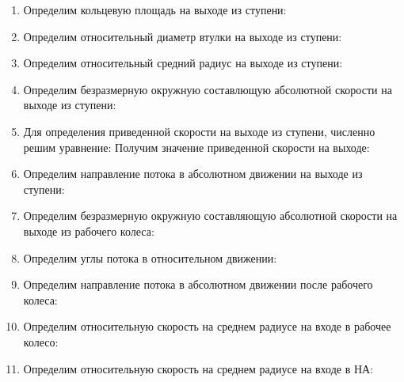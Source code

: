 \begin{enumerate}
	\item Определим кольцевую площадь на выходе из ступени:
	\item Определим относительный диаметр втулки на выходе из ступени:
	\item Определим относительный средний радиус на выходе из ступени:
	\item Определим безразмерную окружную составлющую абсолютной скорости на выходе из ступени:
	\item Для определения приведенной скорости на выходе из ступени, численно решим уравнение:
		Получим значение приведенной скорости на выходе:
	\item Определим направление потока в абсолютном движении на выходе из ступени:
	\item Определим безразмерную окружную составляющую абсолютной скорости на выходе из рабочего колеса:
	\item Определим углы потока в относительном движении:
	\item Определим направление потока в абсолютном движении после рабочего колеса:
	\item Определим относительную скорость на среднем радиусе на входе в рабочее колесо:
	\item Определим относительную скорость на среднем радиусе на входе в НА:
\end{enumerate}



